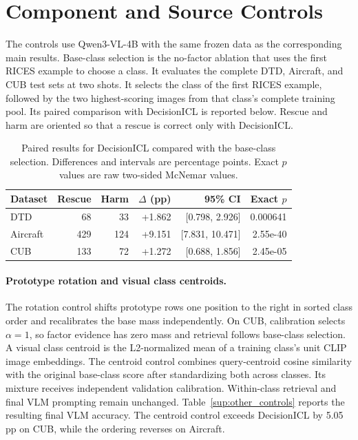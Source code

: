 \documentclass[10pt,twocolumn,letterpaper]{article}
\newcommand{\method}{DecisionICL\xspace}
\begin{document}
\section{Component and Source Controls}
\label{sec:source}
The controls use Qwen3-VL-4B with the same frozen data as the corresponding main results. Base-class selection is the no-factor ablation that uses the first RICES example to choose a class. It evaluates the complete DTD, Aircraft, and CUB test sets at two shots. It selects the class of the first RICES example, followed by the two highest-scoring images from that class's complete training pool. Its paired comparison with \method is reported below. Rescue and harm are oriented so that a rescue is correct only with \method.

\begin{table}[t]
\caption{Paired results for \method compared with the base-class selection. Differences and intervals are percentage points. Exact $p$ values are raw two-sided McNemar values.}
\label{sup:gate_paired}
\centering\small
\begin{tabular}{lrrrrr}
\toprule
Dataset & Rescue & Harm & $\Delta$ (pp) & 95\% CI & Exact $p$ \\
\midrule
DTD & 68 & 33 & +1.862 & [0.798, 2.926] & 0.000641 \\
Aircraft & 429 & 124 & +9.151 & [7.831, 10.471] & 2.55e-40 \\
CUB & 133 & 72 & +1.272 & [0.688, 1.856] & 2.45e-05 \\
\bottomrule
\end{tabular}
\end{table}

\paragraph{Prototype rotation and visual class centroids.}
The rotation control shifts prototype rows one position to the right in sorted class order and recalibrates the base mass independently. On CUB, calibration selects $\alpha=1$, so factor evidence has zero mass and retrieval follows base-class selection. A visual class centroid is the L2-normalized mean of a training class's unit CLIP image embeddings. The centroid control combines query-centroid cosine similarity with the original base-class score after standardizing both across classes. Its mixture receives independent validation calibration. Within-class retrieval and final VLM prompting remain unchanged. Table~\ref{sup:other_controls} reports the resulting final VLM accuracy. The centroid control exceeds \method by 5.05 pp on CUB, while the ordering reverses on Aircraft.
\end{document}
